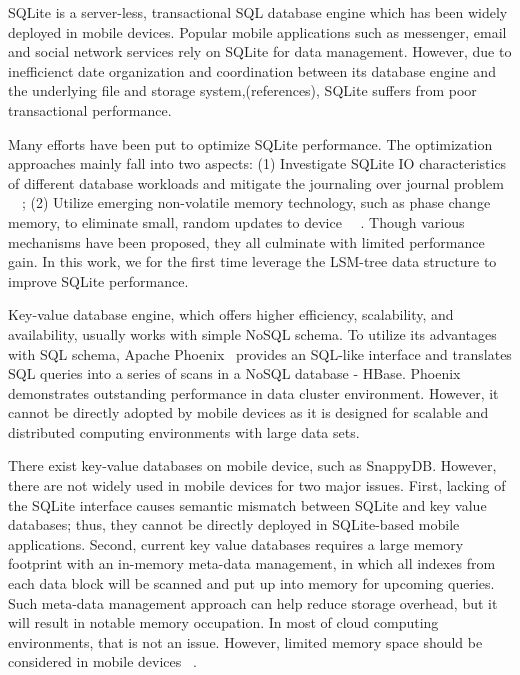 SQLite is a server-less, transactional SQL database engine which has been widely deployed in mobile devices. Popular mobile applications such as messenger, email and social network services rely on SQLite
for data management. However, due to inefficienct date organization and coordination between its database engine and the underlying file and storage system,(references), SQLite suffers from poor transactional performance.

Many efforts have been put to optimize SQLite performance. The optimization approaches mainly fall into two aspects: (1) Investigate SQLite IO characteristics of different database workloads and mitigate the journaling over journal problem ~\cite{shen2014journaling}~\cite{jeong2013stack}; (2) Utilize emerging non-volatile memory technology, such as phase change memory, to eliminate small, random updates to device ~\cite{oh2015sqlite}~\cite{kim2016nvwal}. Though various mechanisms have been proposed, they all culminate with limited performance gain. In this work, we for the first time leverage the LSM-tree data structure  to improve SQLite performance.

Key-value database engine, which offers higher efficiency, scalability, and availability, usually works with simple NoSQL schema. To utilize its advantages with SQL schema, Apache Phoenix~\cite{ApachePhoenix} provides an SQL-like interface and translates SQL queries into a series of scans in  a NoSQL database - HBase. Phoenix demonstrates outstanding performance in data cluster environment. However, it cannot be directly adopted by mobile devices as it is designed for scalable and distributed computing environments with large data sets. 

There exist key-value databases on mobile device, such as SnappyDB. However, there  are not widely used in mobile devices for two major issues. First, lacking of the SQLite interface causes semantic mismatch between SQLite and key value databases; thus, they cannot be directly deployed in SQLite-based mobile applications.  Second, current key value databases requires a large memory footprint with an in-memory meta-data management, in which all indexes from each data block will be scanned and put up into memory for upcoming queries. Such meta-data management approach can help reduce storage overhead, but it will result in notable memory occupation. In most of cloud computing environments, that is not an issue. However, limited memory space should be considered in mobile devices ~\cite{lee2003energy}. 

